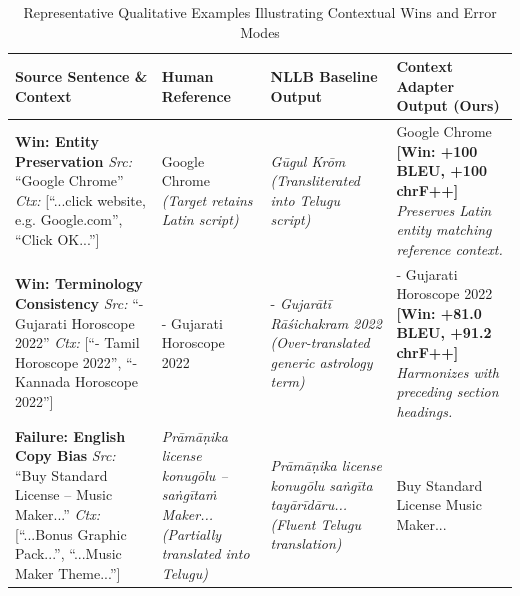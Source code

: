 \documentclass[conference]{IEEEtran}
\begin{document}
\begin{table}[t]
\caption{Representative Qualitative Examples Illustrating Contextual Wins and Error Modes}
\label{tab:qualitative}
\centering
\small
\begin{tabular}{p{}p{}p{}p{}}
\toprule
\textbf{Source Sentence \& Context} & \textbf{Human Reference} & \textbf{NLLB Baseline Output} & \textbf{Context Adapter Output (Ours)} \\
\midrule
\textbf{Win: Entity Preservation}\newline
\textit{Src:} ``Google Chrome''\newline
\textit{Ctx:} [``...click website, e.g. Google.com'', ``Click OK...''] &
Google Chrome\newline
\textit{(Target retains Latin script)} &
\textit{G\=ugul Kr\=om}\newline
\textit{(Transliterated into Telugu script)} &
Google Chrome\newline
\textbf{[Win: +100 BLEU, +100 chrF++]}\newline
\textit{Preserves Latin entity matching reference context.} \\
\midrule
\textbf{Win: Terminology Consistency}\newline
\textit{Src:} ``- Gujarati Horoscope 2022''\newline
\textit{Ctx:} [``- Tamil Horoscope 2022'', ``- Kannada Horoscope 2022''] &
- Gujarati Horoscope 2022 &
- \textit{Gujar\=at\=i R\=a\'sichakram 2022}\newline
\textit{(Over-translated generic astrology term)} &
- Gujarati Horoscope 2022\newline
\textbf{[Win: +81.0 BLEU, +91.2 chrF++]}\newline
\textit{Harmonizes with preceding section headings.} \\
\midrule
\textbf{Failure: English Copy Bias}\newline
\textit{Src:} ``Buy Standard License -- Music Maker...''\newline
\textit{Ctx:} [``...Bonus Graphic Pack...'', ``...Music Maker Theme...''] &
\textit{Pr\=am\=a\d{n}ika license konug\=olu -- sa\.{n}g\=ita\.{m} Maker...}\newline
\textit{(Partially translated into Telugu)} &
\textit{Pr\=am\=a\d{n}ika license konug\=olu sa\.{n}g\=ita tay\=ar\=id\=aru...}\newline
\textit{(Fluent Telugu translation)} &
Buy Standard License Music Maker...\newline

\end{tabular}
\end{table}
\end{document}
